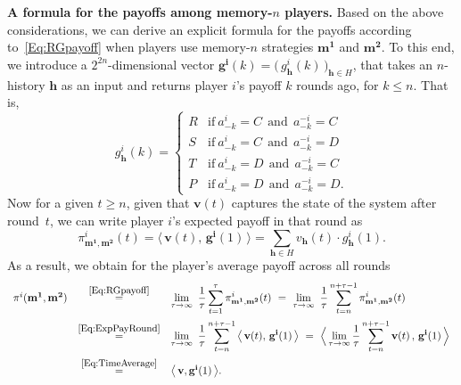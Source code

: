 \documentclass[9pt,twoside,lineno]{pnas-new}
\theoremstyle{plainCl1}
\theoremstyle{plainCl2}
\begin{document}
\noindent
{\bf A formula for the payoffs among memory-$n$ players.} Based on the above considerations, we can derive an explicit formula for the payoffs according to~\eqref{Eq:RGpayoff} when players use memory-$n$ strategies $\mathbf{m^1}$ and $\mathbf{m^2}$. 
To this end, we introduce a $2^{2n}$-dimensional vector $\mathbf{g^i}(k)\!=\!\big(\,g^i_\mathbf{h}(k)\,\big)_{\mathbf{h}\in H}$, that takes an $n$-history $\mathbf{h}$ as an input and returns player $i$'s payoff $k$ rounds ago, for $k\!\le\!n$. 
That is, 
\begin{equation}\label{Eq:g(k)}
    g_\mathbf{h}^i(k) = \left\{
    \begin{array}{cl}
    R	&\text{if}~ a_{-k}^i\!=\!C~~\text{and}~~a_{-k}^{-i}\!=\!C\\[0.1cm]
    S	&\text{if}~ a_{-k}^i\!=\!C~~\text{and}~~ a_{-k}^{-i}\!=\!D\\[0.1cm]
    T	&\text{if}~ a_{-k}^i\!=\!D~~\text{and}~~ a_{-k}^{-i}\!=\!C\\[0.1cm]
    P	&\text{if}~ a_{-k}^i\!=\!D~~\text{and}~~ a_{-k}^{-i}\!=\!D.
    \end{array}
    \right.
\end{equation}
Now for a given $t\!\ge\!n$, given that  $\mathbf{v}(t)$ captures the state of the system after round~$t$, we can write player $i$'s expected payoff in that round as
\begin{equation} \label{Eq:ExpPayRound}
\pi^i_{\mathbf{m^1},\mathbf{m^2}}(t) = \big\langle \,\mathbf{v}(t),\, \mathbf{g^i}(1)\,\big\rangle = \sum_{\mathbf{h}\in H} v_\mathbf{h}(t) \cdot g^i_\mathbf{h}(1). 
\end{equation}
As a result, we obtain for the player's average payoff across all rounds
\begin{equation} \label{Eq:PayoffMemoryn}
\begin{array}{rcl}
\pi^i(\mathbf{m^1},\mathbf{m^2}) 
&\stackrel{\mbox{\small \eqref{Eq:RGpayoff}}}{=}  
&\displaystyle \lim_{\tau \to \infty}~ \frac{1}{\tau} \sum_{t=1}^{\tau} \pi^i_{\mathbf{m^1},\mathbf{m^2}}(t)
~=~
\lim_{\tau \to \infty}~ \frac{1}{\tau} \sum_{t=n}^{n+\tau-1} \pi^i_{\mathbf{m^1},\mathbf{m^2}}(t)\\[0.5cm]
&\stackrel{\mbox{\small \eqref{Eq:ExpPayRound}}}{=}  
&\displaystyle \lim_{\tau \to \infty}~ \frac{1}{\tau} \sum_{t=n}^{n+\tau-1}\big\langle \,\mathbf{v}(t),\, \mathbf{g^i}(1)\,\big\rangle
~=~
\Big\langle \lim_{\tau \to \infty} \frac{1}{\tau} \sum_{t=n}^{n+\tau-1} \mathbf{v}(t)\, , \, \mathbf{g^i}(1)\,\Big\rangle\\[0.5cm]
&\stackrel{\mbox{\small \eqref{Eq:TimeAverage}}}{=}  
&\big\langle\, \mathbf{v}, \mathbf{g^i}(1)\,\big\rangle .
\end{array}
\end{equation}
\end{document}
